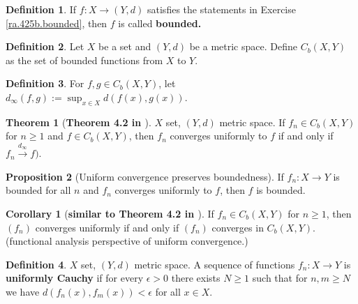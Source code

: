 \documentclass{article}
\theoremstyle{definition}
\newtheorem{theorem}{Theorem}
\theoremstyle{definition}
\newtheorem{proposition}[theorem]{Proposition}
\theoremstyle{definition}
\theoremstyle{definition}
\newtheorem{corollary}{Corollary}[theorem]
\theoremstyle{definition}
\newtheorem{definition}{Definition}[section]
\theoremstyle{definition}
\theoremstyle{definition}
\begin{document}
\begin{definition}

If \(f:X \to (Y, d)\) satisfies the statements in Exercise \ref{ra.425b.bounded}, then \(f\) is called \textbf{bounded.}

\end{definition}

\begin{definition}

Let \(X\) be a set and \((Y,d)\) be a metric space. Define \(C_b(X,Y)\) as the set of bounded functions from \(X\) to \(Y\). 



\end{definition}


\begin{definition}

For \(f, g \in C_b(X, Y)\), let \(d_\infty(f, g) := \sup_{x \in X} d(f(x), g(x))\). 

\end{definition}



\begin{theorem}[\textbf{Theorem 4.2 in \citet{pugh2015real}}]

\(X\) set, \((Y,d)\) metric space. If \(f_n \in C_b(X, Y)\) for \(n \geq 1\) and \(f \in C_b(X, Y)\), then \(f_n\) converges uniformly to \(f\) if and only if \(f_n \xrightarrow{d_\infty} f)\). 

\end{theorem}

\begin{proposition}[Uniform convergence preserves boundedness]

If \(f_n: X \to Y\) is bounded for all \(n\) and \(f_n\) converges uniformly to \(f\), then \(f\) is bounded.

\end{proposition}

\begin{corollary}[\textbf{similar to Theorem 4.2 in \citet{pugh2015real}}]

If \(f_n \in C_b(X, Y)\) for \(n \geq 1\), then \((f_n)\) converges uniformly if and only if \((f_n)\) converges in \(C_b(X, Y)\). (functional analysis perspective of uniform convergence.)

\end{corollary}

\begin{definition}

\(X\) set, \((Y,d)\) metric space. A sequence of functions \(f_n: X \to Y\) is \textbf{uniformly Cauchy} if for every \(\epsilon >0\) there exists \(N \geq 1\) such that for \(n, m \geq N\) we have \(d(f_n(x), f_m(x)) < \epsilon\) for all \(x \in X\).

\end{definition}
\end{document}
